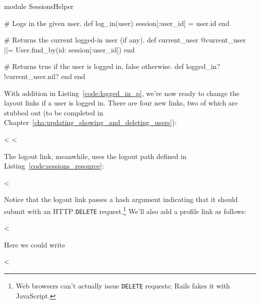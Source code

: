 \begin{codelisting}
\label{code:logged_in_p}
\begin{code}
module SessionsHelper

  # Logs in the given user.
  def log_in(user)
    session[:user_id] = user.id
  end

  # Returns the current logged-in user (if any).
  def current_user
    @current_user ||= User.find_by(id: session[:user_id])
  end

  # Returns true if the user is logged in, false otherwise.
  def logged_in?
    !current_user.nil?
  end
end
\end{code}
\end{codelisting}

With addition in Listing~\ref{code:logged_in_p}, we're now ready to change the layout links if a user is logged in. There are four new links, two of which are stubbed out (to be completed in Chapter~\ref{cha:updating_showing_and_deleting_users}):

\begin{code}
<%
<%
\end{code}

\noindent The logout link, meanwhile, uses the logout path defined in Listing~\ref{code:sessions_resource}:

\begin{code}
<%
\end{code}

\noindent Notice that the logout link passes a hash argument indicating that it should submit with an HTTP \texttt{DELETE} request.\footnote{Web browsers can't actually issue \texttt{DELETE} requests; Rails fakes it with JavaScript.} We'll also add a profile link as follows:

\begin{code}
<%
\end{code}

\noindent Here we could write

\begin{code}
<%
\end{code}

